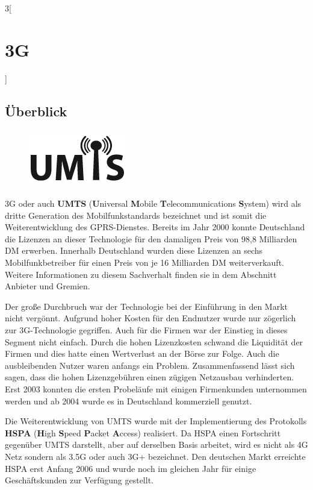 \begin{multicols}{3}[\section{3G}]
\subsection*{Überblick}
\begin{figure}
  \vspace{-20pt}
  \begin{center}
  	\hspace{-20pt}
    \includegraphics[width=0.7\linewidth]{Kapitel/3G/Grafiken/umts_logo.png}
  \end{center}
  \vspace{-15pt}
\end{figure}
3G oder auch \textbf{UMTS} (\textbf{U}niversal \textbf{M}obile \textbf{T}elecommunications \textbf{S}ystem) wird als dritte Generation des Mobilfunkstandards bezeichnet und ist somit die Weiterentwicklung des GPRS-Dienstes. Bereits im Jahr 2000 konnte Deutschland die Lizenzen an dieser Technologie für den damaligen Preis von 98,8 Milliarden DM erwerben. Innerhalb Deutschland wurden diese Lizenzen an sechs Mobilfunkbetreiber für einen Preis von je 16 Milliarden DM weiterverkauft. Weitere Informationen zu diesem Sachverhalt finden sie in dem Abschnitt Anbieter und Gremien. 

Der große Durchbruch war der Technologie bei der Einführung in den Markt nicht vergönnt. Aufgrund hoher Kosten für den Endnutzer wurde nur zögerlich zur 3G-Technologie gegriffen. Auch für die Firmen war der Einstieg in dieses Segment nicht einfach. Durch die hohen Lizenzkosten schwand die Liquidität der Firmen und dies hatte einen Wertverlust an der Börse zur Folge. Auch die ausbleibenden Nutzer waren anfangs ein Problem. Zusammenfassend lässt sich sagen, dass die hohen Lizenzgebühren einen zügigen Netzausbau verhinderten. Erst 2003 konnten die ersten Probeläufe mit einigen Firmenkunden unternommen werden und ab 2004 wurde es in Deutschland kommerziell genutzt. 
 
Die Weiterentwicklung von UMTS wurde mit der Implementierung des Protokolls \textbf{HSPA} (\textbf{H}igh \textbf{S}peed \textbf{P}acket \textbf{A}ccess) realisiert. Da HSPA einen Fortschritt gegenüber UMTS darstellt, aber auf derselben Basis arbeitet, wird es nicht als 4G Netz sondern als 3.5G oder auch 3G+ bezeichnet. Den deutschen Markt erreichte HSPA erst Anfang 2006 und wurde noch im gleichen Jahr für einige Geschäftskunden zur Verfügung gestellt. ~\cite{3G.1, 3G.2}


\end{multicols}
